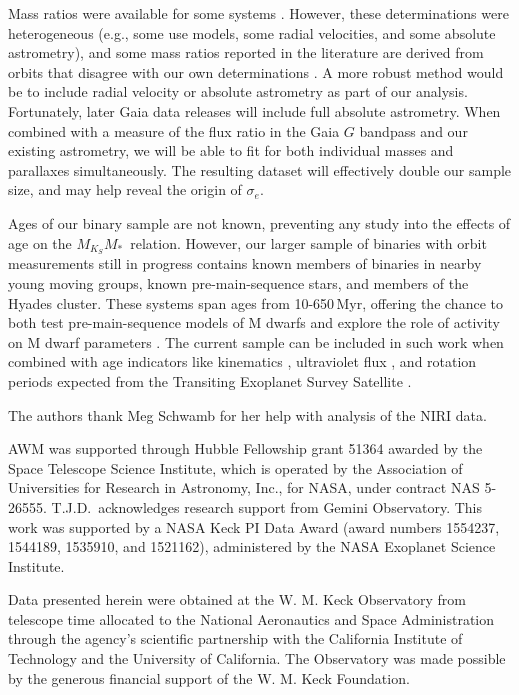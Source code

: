 \documentclass[twocolumn]{aastex62}
\newcommand{\mmk}{$M_{K_S}$\textendash$M_*$}
\begin{document}
Mass ratios were available for some systems \citep[e.g.,][]{Soderhjelm1999,Mlg2007b,Dupuy2017}. However, these determinations were heterogeneous (e.g., some use models, some radial velocities, and some absolute astrometry), and some mass ratios reported in the literature are derived from orbits that disagree with our own determinations \citep[e.g.,][]{Koh2012}. A more robust method would be to include radial velocity or absolute astrometry as part of our analysis. Fortunately, later Gaia data releases will include full absolute astrometry. When combined with a measure of the flux ratio in the Gaia $G$ bandpass and our existing astrometry, we will be able to fit for both individual masses and parallaxes simultaneously. The resulting dataset will effectively double our sample size, and may help reveal the origin of $\sigma_e$. 


Ages of our binary sample are not known, preventing any study into the effects of age on the \mmk\ relation. However, our larger sample of binaries with orbit measurements still in progress contains known members of binaries in nearby young moving groups, known pre-main-sequence stars, and members of the Hyades cluster. These systems span ages from 10-650\,Myr, offering the chance to both test pre-main-sequence models of M dwarfs \citep{2015ApJ...813L..11M,2016ApJ...817..164R,2016ApJ...818..156C,2016AJ....152..175N} and explore the role of activity on M dwarf parameters \citep[e.g.,][]{Spada2013,Kesseli2018}. The current sample can be included in such work when combined with age indicators like kinematics \citep{2018MNRAS.tmp..966W}, ultraviolet flux \citep{Ansdell2015}, and rotation periods expected from the Transiting Exoplanet Survey Satellite \citep[{\it TESS},][]{2014SPIE.9143E..20R}. 


\acknowledgements
The authors thank Meg Schwamb for her help with analysis of the NIRI data. 

AWM was supported through Hubble Fellowship grant 51364 awarded by the Space Telescope Science Institute, which is operated by the Association of Universities for Research in Astronomy, Inc., for NASA, under contract NAS 5-26555. T.J.D.\ acknowledges research support from Gemini Observatory. This work was supported by a NASA Keck PI Data Award (award numbers 1554237, 1544189, 1535910, and 1521162), administered by the NASA Exoplanet Science Institute. 

Data presented herein were obtained at the W. M. Keck Observatory from telescope time allocated to the National Aeronautics and Space Administration through the agency's scientific partnership with the California Institute of Technology and the University of California. The Observatory was made possible by the generous financial support of the W. M. Keck Foundation.
\end{document}
